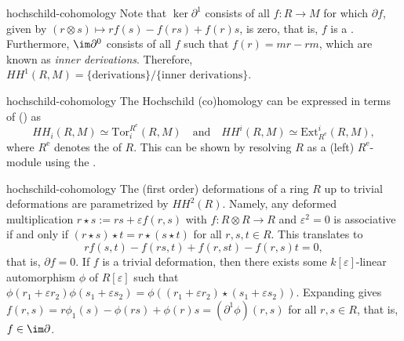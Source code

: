 \begin{example}{hochschild-cohomology}
    Note that $\ker \partial^1$ consists of all $f : R \to M$ for which $\partial f$, given by $(r \otimes s) \mapsto r f(s) - f(rs) + f(r) s$, is zero, that is, $f$ is a . Furthermore, $\im \partial^0$ consists of all $f$ such that $f(r) = mr - rm$, which are known as \textit{inner derivations}. Therefore, $HH^1(R, M) = \{ \text{derivations} \} / \{ \text{inner derivations} \}$.
\end{example}

\begin{example}{hochschild-cohomology}
    The Hochschild (co)homology can be expressed in terms of  () as
    \[ HH_i(R, M) \simeq \text{Tor}_i^{R^\text{e}}(R, M) \quad \text{and} \quad HH^i(R, M) \simeq \text{Ext}^i_{R^\text{e}}(R, M) , \]
    where $R^\text{e}$ denotes the  of $R$. This can be shown by resolving $R$ as a (left) $R^\text{e}$-module using the .
\end{example}


\begin{example}{hochschild-cohomology}
    The (first order) deformations of a ring $R$ up to trivial deformations are parametrized by $HH^2(R)$. Namely, any deformed multiplication $r \star s := rs + \varepsilon f(r, s)$ with $f : R \otimes R \to R$ and $\varepsilon^2 = 0$ is associative if and only if $(r \star s) \star t = r \star (s \star t)$ for all $r, s, t \in R$. This translates to
    \[ r f(s, t) - f(rs, t) + f(r, st) - f(r, s) t = 0 , \]
    that is, $\partial f = 0$. If $f$ is a trivial deformation, then there exists some $k[\varepsilon]$-linear automorphism $\phi$ of $R[\varepsilon]$ such that $\phi(r_1 + \varepsilon r_2) \phi(s_1 + \varepsilon s_2) = \phi((r_1 + \varepsilon r_2) \star (s_1 + \varepsilon s_2))$. Expanding gives $f(r, s) = r \phi_1(s) - \phi(rs) + \phi(r) s = (\partial^1 \phi)(r, s)$ for all $r, s \in R$, that is, $f \in \im \partial$.
\end{example}

